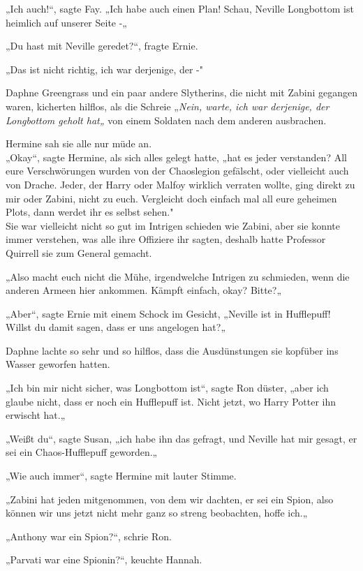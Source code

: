 {„Ich auch!“, sagte Fay. „Ich habe auch einen Plan! Schau, Neville Longbottom ist heimlich auf unserer Seite -„

„Du hast mit Neville geredet?“, fragte Ernie.

„Das ist nicht richtig, ich war derjenige, der -"

Daphne Greengrass und ein paar andere Slytherins, die nicht mit Zabini gegangen waren, kicherten hilflos, als die Schreie „\emph{Nein, warte, ich war derjenige, der Longbottom geholt hat„} von einem Soldaten nach dem anderen ausbrachen.

Hermine sah sie alle nur müde an.\\ „Okay“, sagte Hermine, als sich alles gelegt hatte, „hat es jeder verstanden? All eure Verschwörungen wurden von der Chaoslegion gefälscht, oder vielleicht auch von Drache. Jeder, der Harry oder Malfoy wirklich verraten wollte, ging direkt zu mir oder Zabini, nicht zu euch. Vergleicht doch einfach mal all eure geheimen Plots, dann werdet ihr es selbst sehen."\\ Sie war vielleicht nicht so gut im Intrigen schieden wie Zabini, aber sie konnte immer verstehen, was alle ihre Offiziere ihr sagten, deshalb hatte Professor Quirrell sie zum General gemacht.

„Also macht euch nicht die Mühe, irgendwelche Intrigen zu schmieden, wenn die anderen Armeen hier ankommen. Kämpft einfach, okay? Bitte?„

„Aber“, sagte Ernie mit einem Schock im Gesicht, „Neville ist in Hufflepuff! Willst du damit sagen, dass er uns angelogen hat?„

Daphne lachte so sehr und so hilflos, dass die Ausdünstungen sie kopfüber ins Wasser geworfen hatten.

„Ich bin mir nicht sicher, was Longbottom ist“, sagte Ron düster, „aber ich glaube nicht, dass er noch ein Hufflepuff ist. Nicht jetzt, wo Harry Potter ihn erwischt hat.„

„Weißt du“, sagte Susan, „ich habe ihn das gefragt, und Neville hat mir gesagt, er sei ein Chaos-Hufflepuff geworden.„

„Wie auch immer“, sagte Hermine mit lauter Stimme.

„Zabini hat jeden mitgenommen, von dem wir dachten, er sei ein Spion, also können wir uns jetzt nicht mehr ganz so streng beobachten, hoffe ich.„

„Anthony war ein Spion?“, schrie Ron.

„Parvati war eine Spionin?“, keuchte Hannah.

}
